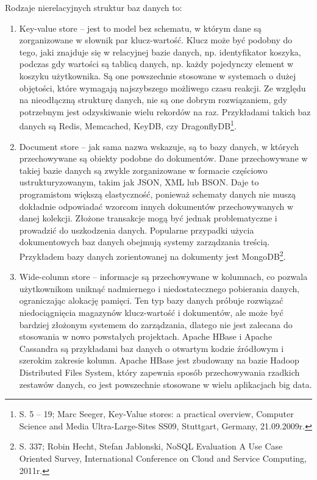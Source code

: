 \documentclass[12pt, a4paper, twoside, openany]{book}
\begin{document}
Rodzaje nierelacyjnych struktur baz danych to:
\begin{enumerate}[label=--]
    \item Key-value store -- jest to model bez schematu, w którym dane są zorganizowane w słownik par klucz-wartość.
          Klucz może być podobny do tego, jaki znajduje się w relacyjnej bazie danych, np. identyfikator koszyka, podczas gdy wartości są tablicą danych, np. każdy pojedynczy element w koszyku użytkownika.
          Są one powszechnie stosowane w systemach o dużej objętości, które wymagają najszybszego możliwego czasu reakcji.
          Ze względu na nieodłączną strukturę danych, nie są one dobrym rozwiązaniem, gdy potrzebnym jest odzyskiwanie wielu rekordów na raz.
          Przykładami takich baz danych są Redis, Memcached, KeyDB, czy DragonflyDB\footnote{S. 5 -- 19; Marc Seeger, Key-Value stores: a practical overview, Computer Science and Media Ultra-Large-Sites SS09, Stuttgart, Germany, 21.09.2009r.}.
    \item Document store -- jak sama nazwa wskazuje, są to bazy danych, w których przechowywane są obiekty podobne do dokumentów.
          Dane przechowywane w takiej bazie danych są zwykle zorganizowane w formacie częściowo ustrukturyzowanym, takim jak JSON, XML lub BSON.
          Daje to programistom większą elastyczność, ponieważ schematy danych nie muszą dokładnie odpowiadać wzorcom innych dokumentów przechowywanych w danej kolekcji.
          Złożone transakcje mogą być jednak problematyczne i prowadzić do uszkodzenia danych.
          Popularne przypadki użycia dokumentowych baz danych obejmują systemy zarządzania treścią.
          Przykładem bazy danych zorientowanej na dokumenty jest MongoDB\footnote{S. 337; Robin Hecht, Stefan Jablonski, NoSQL Evaluation A Use Case Oriented Survey, International Conference on Cloud and Service Computing, 2011r.}.
    \item Wide-column store -- informacje są przechowywane w kolumnach, co pozwala użytkownikom uniknąć nadmiernego i niedostatecznego pobierania danych, ograniczając alokację pamięci.
          Ten typ bazy danych próbuje rozwiązać niedociągnięcia magazynów klucz-wartość i dokumentów, ale może być bardziej złożonym systemem do zarządzania, dlatego nie jest zalecana do stosowania w nowo powstałych projektach.
          Apache HBase i Apache Cassandra są przykładami baz danych o otwartym kodzie źródłowym i szerokim zakresie kolumn.
          Apache HBase jest zbudowany na bazie Hadoop Distributed Files System, który zapewnia sposób przechowywania rzadkich zestawów danych, co jest powszechnie stosowane w wielu aplikacjach big data.

\end{enumerate}
\end{document}
